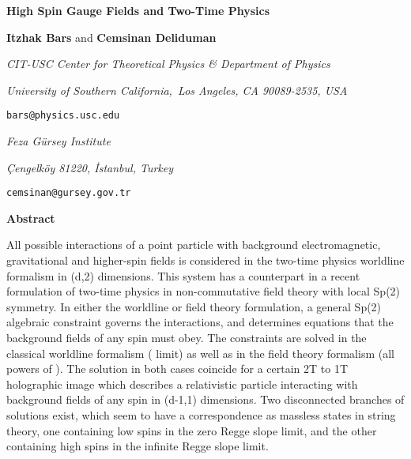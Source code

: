 \documentclass[a4paper,12pt]{article}
\begin{document}
\thispagestyle{empty}


{\small \hfill }

{\vskip0.5cm}

\begin{center}
{\Large \textbf{High Spin Gauge Fields and Two-Time Physics\\[0pt]
}}

\bigskip

{\vskip0.5cm}

\textbf{Itzhak Bars}\coordHE{} \textrm{and} \textbf{Cemsinan Deliduman}\coordHE{}

{\vskip0.5cm}

\coordHE{}\textsl{CIT-USC Center for Theoretical Physics \& Department of
Physics}

\textsl{University of Southern California,\ Los Angeles, CA 90089-2535, USA}

\texttt{bars@physics.usc.edu}

{\vskip0.5cm}

\coordHE{}\textsl{Feza G\"{u}rsey Institute}

\textsl{\c{C}engelk\"{o}y 81220, \.{I}stanbul, Turkey}

\texttt{cemsinan@gursey.gov.tr}

{\vskip1.0cm}

\textbf{Abstract}

{\vskip0.5cm}
\end{center}

All possible interactions of a point particle with background
electromagnetic, gravitational and higher-spin fields is considered in the
two-time physics worldline formalism in (d,2) dimensions. This system has a
counterpart in a recent formulation of two-time physics in non-commutative
field theory with local Sp(2) symmetry. In either the worldline or field
theory formulation, a general Sp(2) algebraic constraint governs the
interactions, and determines equations that the background fields of any
spin must obey. The constraints are solved in the classical worldline
formalism (\coordHE{} limit) as well as in the field theory
formalism (all powers of \myHighlight{$\hbar $}\coordHE{}). The solution in both cases coincide for
a certain 2T to 1T holographic image which describes a relativistic particle
interacting with background fields of any spin in (d-1,1) dimensions. Two
disconnected branches of solutions exist, which seem to have a
correspondence as massless states in string theory, one containing low spins
in the zero Regge slope limit, and the other containing high spins in the
infinite Regge slope limit. \newpage {}
\end{document}
